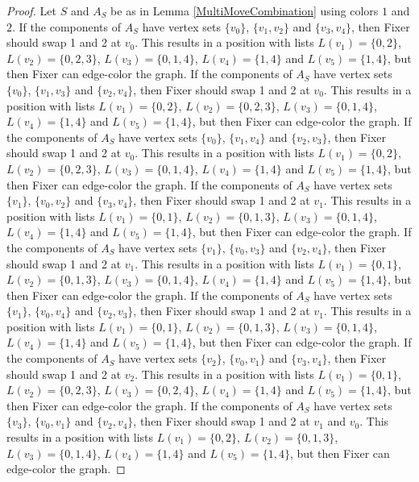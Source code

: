\documentclass[12pt]{amsart}
\theoremstyle{plain}
\theoremstyle{definition}
\theoremstyle{remark}
\begin{document}
\begin{proof}
Let $S$ and $A_S$ be as in Lemma \ref{MultiMoveCombination} using colors $1$ and $2$. If the components of $A_S$ have vertex sets $\{v_0\}$, $\{v_1, v_2\}$ and $\{v_3, v_4\}$, then Fixer should swap 1 and 2 at $v_0$. This results in a position with lists $L(v_1) = \{0, 2\}$, $L(v_2) = \{0, 2, 3\}$, $L(v_3) = \{0, 1, 4\}$, $L(v_4) = \{1, 4\}$ and $L(v_5) = \{1, 4\}$, but then Fixer can edge-color the graph.
If the components of $A_S$ have vertex sets $\{v_0\}$, $\{v_1, v_3\}$ and $\{v_2, v_4\}$, then Fixer should swap 1 and 2 at $v_0$. This results in a position with lists $L(v_1) = \{0, 2\}$, $L(v_2) = \{0, 2, 3\}$, $L(v_3) = \{0, 1, 4\}$, $L(v_4) = \{1, 4\}$ and $L(v_5) = \{1, 4\}$, but then Fixer can edge-color the graph.
If the components of $A_S$ have vertex sets $\{v_0\}$, $\{v_1, v_4\}$ and $\{v_2, v_3\}$, then Fixer should swap 1 and 2 at $v_0$. This results in a position with lists $L(v_1) = \{0, 2\}$, $L(v_2) = \{0, 2, 3\}$, $L(v_3) = \{0, 1, 4\}$, $L(v_4) = \{1, 4\}$ and $L(v_5) = \{1, 4\}$, but then Fixer can edge-color the graph.
If the components of $A_S$ have vertex sets $\{v_1\}$, $\{v_0, v_2\}$ and $\{v_3, v_4\}$, then Fixer should swap 1 and 2 at $v_1$. This results in a position with lists $L(v_1) = \{0, 1\}$, $L(v_2) = \{0, 1, 3\}$, $L(v_3) = \{0, 1, 4\}$, $L(v_4) = \{1, 4\}$ and $L(v_5) = \{1, 4\}$, but then Fixer can edge-color the graph.
If the components of $A_S$ have vertex sets $\{v_1\}$, $\{v_0, v_3\}$ and $\{v_2, v_4\}$, then Fixer should swap 1 and 2 at $v_1$. This results in a position with lists $L(v_1) = \{0, 1\}$, $L(v_2) = \{0, 1, 3\}$, $L(v_3) = \{0, 1, 4\}$, $L(v_4) = \{1, 4\}$ and $L(v_5) = \{1, 4\}$, but then Fixer can edge-color the graph.
If the components of $A_S$ have vertex sets $\{v_1\}$, $\{v_0, v_4\}$ and $\{v_2, v_3\}$, then Fixer should swap 1 and 2 at $v_1$. This results in a position with lists $L(v_1) = \{0, 1\}$, $L(v_2) = \{0, 1, 3\}$, $L(v_3) = \{0, 1, 4\}$, $L(v_4) = \{1, 4\}$ and $L(v_5) = \{1, 4\}$, but then Fixer can edge-color the graph.
If the components of $A_S$ have vertex sets $\{v_2\}$, $\{v_0, v_1\}$ and $\{v_3, v_4\}$, then Fixer should swap 1 and 2 at $v_2$. This results in a position with lists $L(v_1) = \{0, 1\}$, $L(v_2) = \{0, 2, 3\}$, $L(v_3) = \{0, 2, 4\}$, $L(v_4) = \{1, 4\}$ and $L(v_5) = \{1, 4\}$, but then Fixer can edge-color the graph.
If the components of $A_S$ have vertex sets $\{v_3\}$, $\{v_0, v_1\}$ and $\{v_2, v_4\}$, then Fixer should swap 1 and 2 at $v_1$ and $v_0$. This results in a position with lists $L(v_1) = \{0, 2\}$, $L(v_2) = \{0, 1, 3\}$, $L(v_3) = \{0, 1, 4\}$, $L(v_4) = \{1, 4\}$ and $L(v_5) = \{1, 4\}$, but then Fixer can edge-color the graph.

\end{proof}
\end{document}
